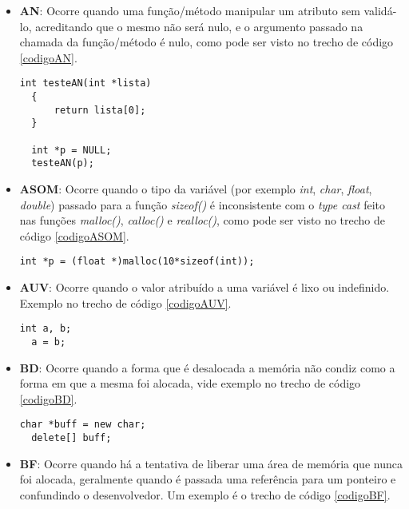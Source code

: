 \begin{itemize}
  \item \textbf{AN}: Ocorre quando uma função/método manipular um atributo sem
    validá-lo, acreditando que o mesmo não será 
    nulo, e o argumento passado na chamada da função/método é nulo, como pode ser visto no trecho de código \ref{codigoAN}.

    \begin{lstlisting}[caption={Código exemplo AN}, label=codigoAN]
  int testeAN(int *lista)
  {
      return lista[0];     
  }
  
  int *p = NULL;
  testeAN(p);
    \end{lstlisting}

  \item \textbf{ASOM}: Ocorre quando o tipo da variável (por exemplo \textit{int}, \textit{char}, \textit{float}, 
    \textit{double}) passado para a função \textit{sizeof()} é inconsistente com o \textit{type cast} feito nas funções 
    \textit{malloc()}, \textit{calloc()} e \textit{realloc()}, como pode ser visto no trecho de código \ref{codigoASOM}.

    \begin{lstlisting}[caption={Código exemplo ASOM}, label=codigoASOM]
  int *p = (float *)malloc(10*sizeof(int));
    \end{lstlisting}
  \item \textbf{AUV}: Ocorre quando o valor atribuído a uma variável é lixo ou indefinido. Exemplo no trecho de código 
    \ref{codigoAUV}.

    \begin{lstlisting}[caption={Código exemplo AUV}, label=codigoAUV]
  int a, b;
  a = b;
    \end{lstlisting}
  \item \textbf{BD}: Ocorre quando a forma que é desalocada a memória não condiz como a forma em que a mesma foi alocada, vide 
    exemplo no trecho de código \ref{codigoBD}.

    \begin{lstlisting}[caption={Código exemplo BD}, label=codigoBD]
  char *buff = new char;
  delete[] buff;
    \end{lstlisting}
  \item \textbf{BF}: Ocorre quando há a tentativa de liberar uma área de memória que nunca foi alocada, geralmente quando é 
    passada uma referência para um ponteiro e confundindo o desenvolvedor. Um exemplo é o trecho de código \ref{codigoBF}.


\end{itemize}
